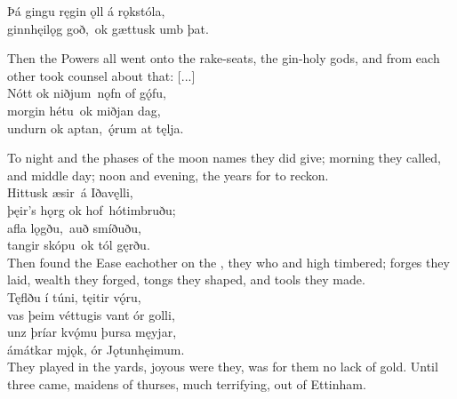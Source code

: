 \bva Þá gingu ręgin ǫll \hld á rǫkstóla, \\%
ginnhęilǫg goð, \hld ok gættusk umb þat.\footnotemark[1]\\%

\bvb Then the Powers all went onto the rake-seats, the gin-holy gods, and from each other took counsel about that: [...]\\%

\bva Nótt ok niðjum \hld nǫfn of gǫ́fu, \\%
morgin hétu \hld ok miðjan dag, \\%
undurn ok aptan, \hld ǫ́rum at tęlja.\footnotemark[1]\\%

\bvb To night and the phases of the moon names they did give; morning they called, and middle day; noon and evening, the years for to reckon.\\%

\bva Hittusk æsir \hld á Iðavęlli, \\%
þęir’s hǫrg ok hof \hld hótimbruðu; \\%
afla lǫgðu, \hld auð smíðuðu, \\%
tangir skópu \hld ok tól gęrðu.\\%

\bvb Then found the Ease eachother on the , they who  and  high timbered; forges they laid, wealth they forged, tongs they shaped, and tools they made.\\%

\bva Tęflðu í túni, \hld tęitir vǫ́ru, \\%
vas þeim véttugis \hld vant ór golli, \\%
unz þríar kvǫ́mu \hld þursa męyjar, \\%
ámátkar mjǫk, \hld ór Jǫtunhęimum.\\%

\bvb They played  in the yards, joyous were they, was for them no lack of gold. Until three came, maidens of thurses, much terrifying, out of Ettinham.\footnotemark[1]\\%

